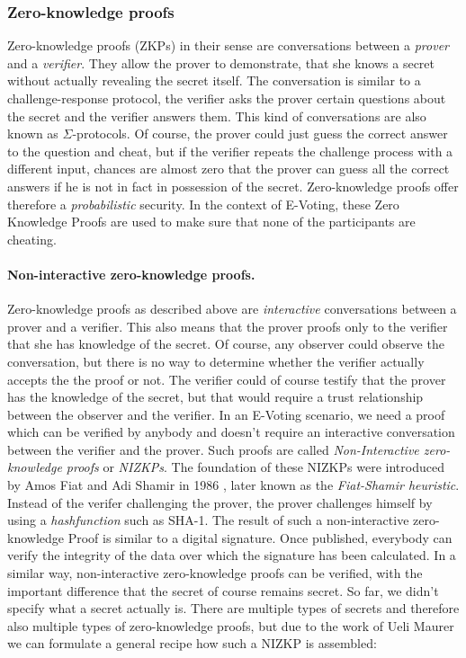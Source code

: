 \documentclass[numbers=noenddot, abstract=on, a4paper, headsepline,
footsepline, oneside, draft=off]{scrreprt}
\begin{document}
\subsubsection{Zero-knowledge proofs}
\label{sec:zeroknowledgeproofs}
Zero-knowledge proofs (ZKPs) in their sense are conversations between a
\textit{prover} and a \textit{verifier}. They allow the prover to demonstrate,
that she knows a secret without actually revealing the secret itself. The
conversation is similar to a challenge-response protocol, the verifier asks the
prover certain questions about the secret and the verifier answers them. This
kind of conversations are also known as $\Sigma$-protocols. Of course, the
prover could just guess the correct answer to the question and cheat, but if the
verifier repeats the challenge process with a different input, chances are
almost zero that the prover can guess all the correct answers if he is not in
fact in possession of the secret. Zero-knowledge proofs offer therefore a
\textit{probabilistic} security. In the context of E-Voting, these Zero
Knowledge Proofs are used to make sure that none of the participants are
cheating.

\paragraph{Non-interactive zero-knowledge proofs.}
Zero-knowledge proofs as described above are \textit{interactive} conversations
between a prover and a verifier. This also means that the prover proofs only to
the verifier that she has knowledge of the secret. Of course, any observer could
observe the conversation, but there is no way to determine whether the verifier
actually accepts the the proof or not. The verifier could of course testify that
the prover has the knowledge of the secret, but that would require a trust
relationship between the observer and the verifier. In an E-Voting scenario, we
need a proof which can be verified by anybody and doesn't require an interactive
conversation between the verifier and the prover. Such proofs are called
\textit{Non-Interactive zero-knowledge proofs} or \textit{NIZKPs}. The
foundation of these NIZKPs were introduced by Amos Fiat and Adi Shamir in 1986
\cite{FS87}, later known as the \textit{Fiat-Shamir heuristic}. Instead of the
verifer challenging the prover, the prover challenges himself by using a
\textit{hashfunction} such as SHA-1. The result of such a non-interactive
zero-knowledge Proof is similar to a digital signature. Once published,
everybody can verify the integrity of the data over which the signature has been
calculated. In a similar way, non-interactive zero-knowledge proofs can be
verified, with the important difference that the secret of course remains
secret. So far, we didn't specify what a secret actually is. There are multiple
types of secrets and therefore also multiple types of zero-knowledge proofs, but
due to the work of Ueli Maurer \cite{Maurer09} we can formulate a general
recipe how such a NIZKP is assembled:
\end{document}
